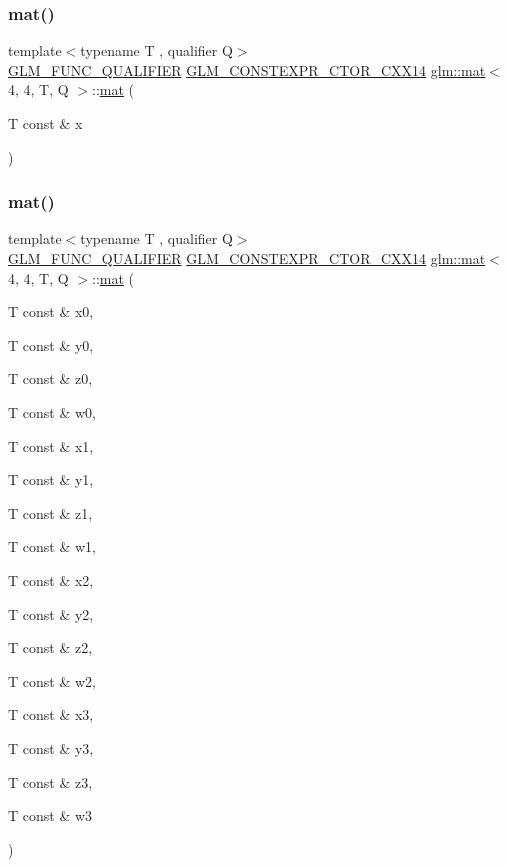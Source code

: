 \subsubsection{\texorpdfstring{mat()}{mat()}\hspace{0.1cm}{\footnotesize\ttfamily [4/21]}}
{\footnotesize\ttfamily template$<$typename T , qualifier Q$>$ \\
\hyperlink{setup_8hpp_a33fdea6f91c5f834105f7415e2a64407}{G\+L\+M\+\_\+\+F\+U\+N\+C\+\_\+\+Q\+U\+A\+L\+I\+F\+I\+ER} \hyperlink{setup_8hpp_a0900f9145e68bf6061b6f5e7be3fa751}{G\+L\+M\+\_\+\+C\+O\+N\+S\+T\+E\+X\+P\+R\+\_\+\+C\+T\+O\+R\+\_\+\+C\+X\+X14} \hyperlink{structglm_1_1mat}{glm\+::mat}$<$ 4, 4, T, Q $>$\+::\hyperlink{structglm_1_1mat}{mat} (\begin{DoxyParamCaption}\item[{T const \&}]{x }\end{DoxyParamCaption})\hspace{0.3cm}{\ttfamily [explicit]}}

\mbox{\label{structglm_1_1mat_3_014_00_014_00_01_t_00_01_q_01_4_a438e4c1e65784ac11fcd29f4ae55e9c7}} 
\subsubsection{\texorpdfstring{mat()}{mat()}\hspace{0.1cm}{\footnotesize\ttfamily [5/21]}}
{\footnotesize\ttfamily template$<$typename T , qualifier Q$>$ \\
\hyperlink{setup_8hpp_a33fdea6f91c5f834105f7415e2a64407}{G\+L\+M\+\_\+\+F\+U\+N\+C\+\_\+\+Q\+U\+A\+L\+I\+F\+I\+ER} \hyperlink{setup_8hpp_a0900f9145e68bf6061b6f5e7be3fa751}{G\+L\+M\+\_\+\+C\+O\+N\+S\+T\+E\+X\+P\+R\+\_\+\+C\+T\+O\+R\+\_\+\+C\+X\+X14} \hyperlink{structglm_1_1mat}{glm\+::mat}$<$ 4, 4, T, Q $>$\+::\hyperlink{structglm_1_1mat}{mat} (\begin{DoxyParamCaption}\item[{T const \&}]{x0,  }\item[{T const \&}]{y0,  }\item[{T const \&}]{z0,  }\item[{T const \&}]{w0,  }\item[{T const \&}]{x1,  }\item[{T const \&}]{y1,  }\item[{T const \&}]{z1,  }\item[{T const \&}]{w1,  }\item[{T const \&}]{x2,  }\item[{T const \&}]{y2,  }\item[{T const \&}]{z2,  }\item[{T const \&}]{w2,  }\item[{T const \&}]{x3,  }\item[{T const \&}]{y3,  }\item[{T const \&}]{z3,  }\item[{T const \&}]{w3 }\end{DoxyParamCaption})}

